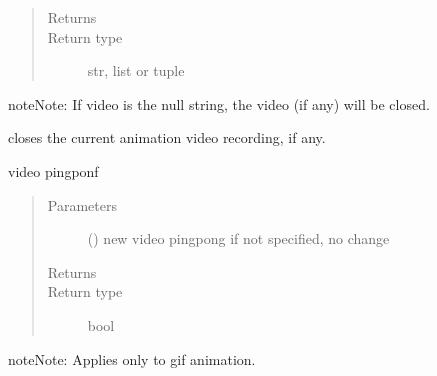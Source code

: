 \documentclass[letterpaper,10pt,english]{sphinxmanual}
\begin{document}
\begin{fulllineitems}
\begin{fulllineitems}
\begin{quote}
\begin{description}
\item[{Returns}] \leavevmode
{}

\item[{Return type}] \leavevmode
str, list or tuple

\end{description}\end{quote}

\begin{sphinxadmonition}{note}{Note:}
If video is the null string, the video (if any) will be closed.
\end{sphinxadmonition}

\end{fulllineitems}


\begin{fulllineitems}
\label{\detokenize{Reference:salabim.Environment.video_close}}
closes the current animation video recording, if any.

\end{fulllineitems}


\begin{fulllineitems}
\label{\detokenize{Reference:salabim.Environment.video_pingpong}}
video pingponf
\begin{quote}\begin{description}
\item[{Parameters}] \leavevmode
{} () \textendash{} new video pingpong 
if not specified, no change

\item[{Returns}] \leavevmode
{}

\item[{Return type}] \leavevmode
bool

\end{description}\end{quote}

\begin{sphinxadmonition}{note}{Note:}
Applies only to gif animation.
\end{sphinxadmonition}

\end{fulllineitems}


\end{fulllineitems}
\end{document}
